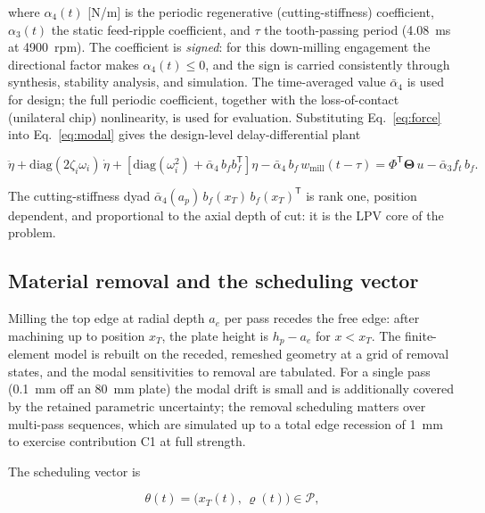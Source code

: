 \documentclass[preprint,12pt]{elsarticle}
\newcommand{\wmill}{w_{\mathrm{mill}}}
\newcommand{\T}{\mathsf{T}}
\begin{document}
where $\alpha_4(t)$ [N/m] is the periodic regenerative
(cutting-stiffness) coefficient, $\alpha_3(t)$ the static feed-ripple
coefficient, and $\tau$ the tooth-passing period (4.08~ms at 4900~rpm).
The coefficient is \emph{signed}: for this down-milling engagement the
directional factor makes $\alpha_4(t) \le 0$, and the sign is carried
consistently through synthesis, stability analysis, and simulation. The
time-averaged value $\bar{\alpha}_4$ is used for design; the full
periodic coefficient, together with the loss-of-contact (unilateral
chip) nonlinearity, is used for evaluation. Substituting
Eq.~\eqref{eq:force} into Eq.~\eqref{eq:modal} gives the design-level
delay-differential plant

\begin{equation}
\label{eq:dde}
\ddot{\eta} + \mathrm{diag}(2 \zeta_i \omega_i)\, \dot{\eta}
+ \left[ \mathrm{diag}(\omega_i^2)
+ \bar{\alpha}_4\, b_f b_f^{\T} \right] \eta
- \bar{\alpha}_4\, b_f\, \wmill(t - \tau)
= \Phi^{\T} \boldsymbol{\Theta}\, u - \bar{\alpha}_3 f_t\, b_f .
\end{equation}

The cutting-stiffness dyad
$\bar{\alpha}_4(a_p)\, b_f(x_T)\, b_f(x_T)^{\T}$ is rank one, position
dependent, and proportional to the axial depth of cut: it is the LPV
core of the problem.

\subsection{Material removal and the scheduling vector}
\label{sec:scheduling}

Milling the top edge at radial depth $a_e$ per pass recedes the free
edge: after machining up to position $x_T$, the plate height is
$h_p - a_e$ for $x < x_T$. The finite-element model is rebuilt on the
receded, remeshed geometry at a grid of removal states, and the modal
sensitivities to removal are tabulated. For a single pass (0.1~mm off an
80~mm plate) the modal drift is small and is additionally covered by the
retained parametric uncertainty; the removal scheduling matters over
multi-pass sequences, which are simulated up to a total edge recession
of 1~mm to exercise contribution C1 at full strength.

The scheduling vector is

\begin{equation}
\label{eq:theta}
\theta(t) = \bigl( x_T(t),\, \varrho(t) \bigr) \in \mathcal{P},
\end{equation}
\end{document}
